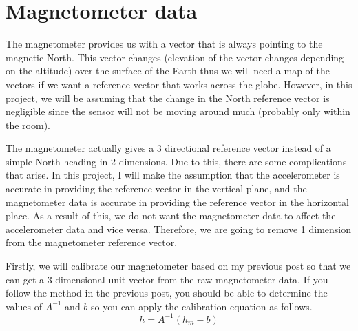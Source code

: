 \documentclass[a4paper,12pt]{book}
\begin{document}
\section{Magnetometer data}

The magnetometer provides us with a vector that is always pointing to the magnetic North. This vector changes (elevation of the vector changes depending on the altitude) over the surface of the Earth thus we will need a map of the vectors if we want a reference vector that works across the globe. However, in this project, we will be assuming that the change in the North reference vector is negligible since the sensor will not be moving around much (probably only within the room).

The magnetometer actually gives a 3 directional reference vector instead of a simple North heading in 2 dimensions. Due to this, there are some complications that arise. In this project, I will make the assumption that the accelerometer is accurate in providing the reference vector in the vertical plane, and the magnetometer data is accurate in providing the reference vector in the horizontal place. As a result of this, we do not want the magnetometer data to affect the accelerometer data and vice versa. Therefore, we are going to remove 1 dimension from the magnetometer reference vector.

Firstly, we will calibrate our magnetometer based on my previous post so that we can get a 3 dimensional unit vector from the raw magnetometer data. If you follow the method in the previous post, you should be able to determine the values of $A^{-1}$ and $b$ so you can apply the calibration equation as follows.
\begin{equation}
   h=A^{-1}(h_m - b) 
\end{equation}
\end{document}
